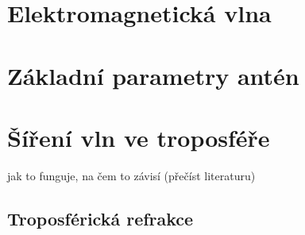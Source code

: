 \documentclass[twoside]{ctuthesis}
\theoremstyle{plain}
\theoremstyle{definition}
\theoremstyle{note}
\begin{document}




	\section{Elektromagnetická vlna}
	\section{Základní parametry antén}
	\section{Šíření vln ve troposféře}
	jak to funguje, na čem to závisí (přečíst literaturu)
		\subsection{Troposférická refrakce}
\end{document}
